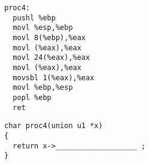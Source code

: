 \begin{problem}{12}
\begin{choice}
\item
\begin{minipage}[t]{2.3in}
\begin{verbatim}
proc4:
  pushl %ebp
  movl %esp,%ebp
  movl 8(%ebp),%eax
  movl (%eax),%eax
  movl 24(%eax),%eax
  movl (%eax),%eax
  movsbl 1(%eax),%eax
  movl %ebp,%esp
  popl %ebp
  ret
\end{verbatim}
\end{minipage}
%
\hspace{0.1in}
%
\begin{minipage}[t]{3.3in}
\begin{verbatim}
char proc4(union u1 *x)
{
  return x->___________________ ;
}
\end{verbatim}
\end{minipage}
\end{choice}

\end{problem}
